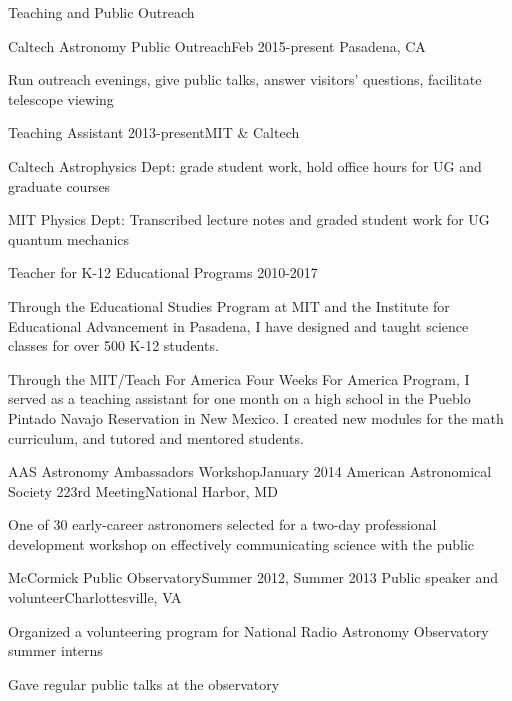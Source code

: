 \documentclass{resume} %
\begin{document}
\begin{rSection}{Teaching and Public Outreach}

  \begin{rSubsection}{Caltech Astronomy Public Outreach}{Feb 2015-present}
    {}{Pasadena, CA}
  \item Run outreach evenings, give public talks, answer visitors' questions,
    facilitate telescope viewing
  \end{rSubsection}

  \begin{rSubsection}{Teaching Assistant} 
    {2013-present}{}{MIT \& Caltech}
  \item Caltech Astrophysics Dept: grade student work, hold office hours 
    for UG and graduate courses
  \item MIT Physics Dept: Transcribed lecture notes and graded student work
    for UG quantum mechanics
  \end{rSubsection}

  \begin{rSubsection}{Teacher for K-12 Educational Programs}
    {2010-2017}{}{}
  \item Through the Educational Studies Program at MIT and the 
    Institute for Educational Advancement in Pasadena, 
    I have designed and taught science
    classes for over 500 K-12 students.
  \item Through the MIT/Teach For America Four Weeks For America Program,
    I served as a teaching assistant for one month on a high school in
    the Pueblo Pintado Navajo Reservation in New Mexico. I created
    new modules for the math curriculum, and tutored and mentored students.
  \end{rSubsection}

  \begin{rSubsection}{AAS Astronomy Ambassadors Workshop}{January 2014}
  {American Astronomical Society 223rd Meeting}{National Harbor, MD}
  \item One of 30 early-career astronomers selected for a two-day professional development workshop on effectively communicating science with the public
  \end{rSubsection}

  \begin{rSubsection}{McCormick Public Observatory}{Summer 2012, Summer 2013}
    {Public speaker and volunteer}{Charlottesville, VA}
  \item Organized a volunteering program for National Radio Astronomy Observatory summer interns
  \item Gave regular public talks at the observatory
  \end{rSubsection}

\end{rSection}
\end{document}
